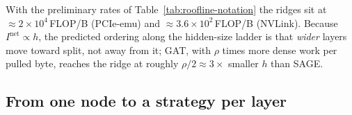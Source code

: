 With the preliminary rates of Table~\ref{tab:roofline-notation} the ridges sit at
$\approx 2\times10^{4}$\,FLOP/B (PCIe-emu) and $\approx 3.6\times10^{2}$\,FLOP/B (NVLink).
 Because
$I^{\mathrm{net}}\propto h$, the predicted ordering along the hidden-size ladder is that
\emph{wider} layers move toward split, not away from it; GAT, with $\rho$ times more dense
work per pulled byte, reaches the ridge at roughly $\rho/2 \approx 3\times$ smaller $h$ than
SAGE.

\subsection{From one node to a strategy per layer}
\label{sec:roofline-strategy}

